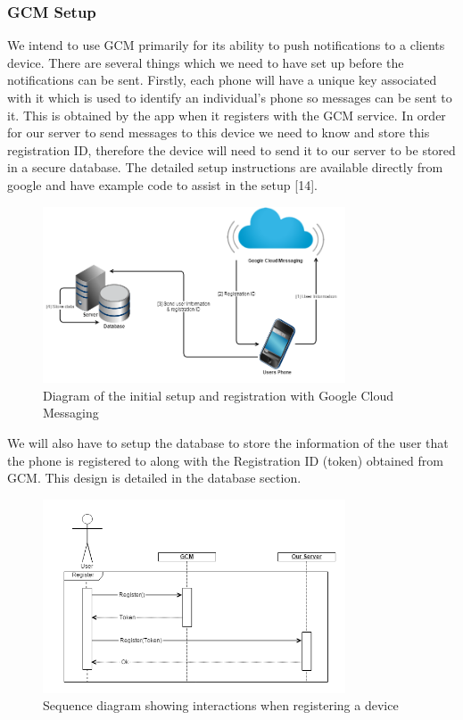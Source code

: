 \documentclass{article}
\begin{document}
		
		
		\subsubsection{GCM Setup}
		We intend to use GCM primarily for its ability to push notifications to a clients device. There are several things which we need to have set up before the notifications can be sent. Firstly, each phone will have a unique key associated with it which is used to identify an individual's phone so messages can be sent to it. This is obtained by the app when it registers with the GCM service. In order for our server to send messages to this device we need to know and store this registration ID, therefore the device will need to send it to our server to be stored in a secure database. The detailed setup instructions are available directly from google and have example code to assist in the setup [14]. \\

	\begin{figure}[H]
		\centering
		\includegraphics[width=0.8\textwidth]{"Initial GCM Setup - Iteration 0"}
		\caption{Diagram of the initial setup and registration with Google Cloud Messaging}
	\end{figure}
	
	We will also have to setup the database to store the information of the user that the phone is registered to along with the Registration ID (token) obtained from GCM. This design is detailed in the database section.\\
	
	\begin{figure}[H]
		\centering
		\includegraphics[width=0.8\textwidth]{"GCM Registration Sequence Diagram - Iteration 0"}
		\caption{Sequence diagram showing interactions when registering a device}
	\end{figure}
\end{document}
